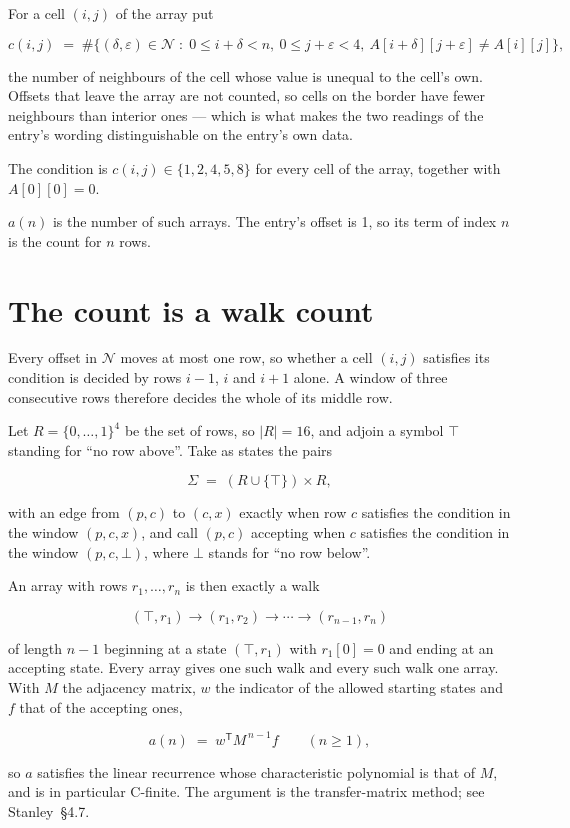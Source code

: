 \documentclass[11pt]{article}
\theoremstyle{definition}
\begin{document}
For a cell $(i,j)$ of the array put

\[c(i,j) \;=\; \#\bigl\{(\delta,\varepsilon)\in\mathcal{N} \;:\; 0\le i+\delta<n,\ 0\le j+\varepsilon<4,\ A[i+\delta][j+\varepsilon] \neq A[i][j]\bigr\},\]

the number of neighbours of the cell whose value is unequal to the cell's own. Offsets that leave the array are not counted, so cells on the border have fewer neighbours than interior ones --- which is what makes the two readings of the entry's wording distinguishable on the entry's own data.

The condition is $c(i,j) \in \{1, 2, 4, 5, 8\}$ for every cell of the array, together with $A[0][0]=0$.

$a(n)$ is the number of such arrays. The entry's offset is 1, so its term of index $n$ is the count for $n$ rows.

\section{The count is a walk count}

Every offset in $\mathcal{N}$ moves at most one row, so whether a cell $(i,j)$ satisfies its condition is decided by rows $i-1$, $i$ and $i+1$ alone. A window of three consecutive rows therefore decides the whole of its middle row.

Let $R = \{0,\dots,1\}^{4}$ be the set of rows, so $|R| = 16$, and adjoin a symbol $\top$ standing for ``no row above''. Take as states the pairs

\[\Sigma \;=\; (R \cup \{\top\}) \times R,\]

with an edge from $(p,c)$ to $(c,x)$ exactly when row $c$ satisfies the condition in the window $(p,c,x)$, and call $(p,c)$ accepting when $c$ satisfies the condition in the window $(p,c,\bot)$, where $\bot$ stands for ``no row below''.

An array with rows $r_1,\dots,r_n$ is then exactly a walk

\[(\top,r_1) \to (r_1,r_2) \to \cdots \to (r_{n-1},r_n)\]

of length $n-1$ beginning at a state $(\top,r_1)$ with $r_1[0]=0$ and ending at an accepting state. Every array gives one such walk and every such walk one array. With $M$ the adjacency matrix, $w$ the indicator of the allowed starting states and $f$ that of the accepting ones,

\[a(n) \;=\; w^{\mathsf T} M^{\,n-1} f \qquad (n \ge 1),\]

so $a$ satisfies the linear recurrence whose characteristic polynomial is that of $M$, and is in particular C-finite. The argument is the transfer-matrix method; see Stanley~\S4.7.
\end{document}
